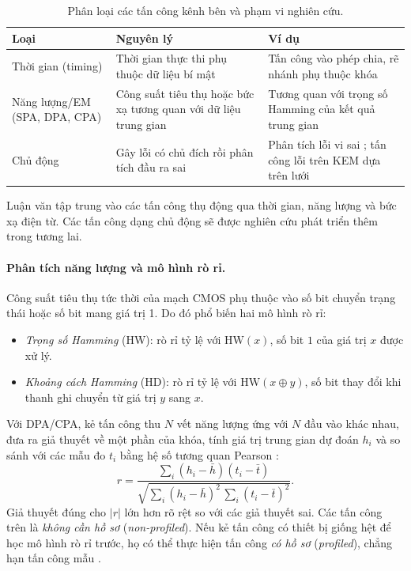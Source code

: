 \documentclass[../LuanVan.tex]{subfiles}
\begin{document}
\begin{table}[H]
\centering
\caption{Phân loại các tấn công kênh bên và phạm vi nghiên cứu.}
\label{tab:sca}
\begin{tabular}{L{3.2cm}|L{5cm}|L{5.5cm}}
\hline
\textbf{Loại} & \textbf{Nguyên lý} & \textbf{Ví dụ} \\ \hline
Thời gian (timing) & Thời gian thực thi phụ thuộc dữ liệu bí mật & Tấn công vào phép chia, rẽ nhánh phụ thuộc khóa \cite{Kocher96,KyberSlash24} \\ \hline
Năng lượng/EM \newline (SPA, DPA, CPA) & Công suất tiêu thụ hoặc bức xạ tương quan với dữ liệu trung gian & Tương quan với trọng số Hamming của kết quả trung gian \cite{KocherJJ99,BrierCO04} \\ \hline
Chủ động & Gây lỗi có chủ đích rồi phân tích đầu ra sai & Phân tích lỗi vi sai \cite{BihamShamir97}; tấn công lỗi trên KEM dựa trên lưới \cite{PesslProkop21} \\ \hline
\end{tabular}
\end{table}

Luận văn tập trung vào các tấn công thụ động qua thời gian, năng lượng và bức xạ điện từ. Các tấn công dạng chủ động sẽ được nghiên cứu phát triển thêm trong tương lai.

\paragraph{Phân tích năng lượng và mô hình rò rỉ.} Công suất tiêu thụ tức thời của mạch CMOS phụ thuộc vào số bit chuyển trạng thái hoặc số bit mang giá trị 1. Do đó phổ biến hai mô hình rò rỉ:
\begin{itemize}
    \item \textit{Trọng số Hamming} (HW): rò rỉ tỷ lệ với $\mathrm{HW}(x)$, số bit $1$ của giá trị $x$ được xử lý.
    \item \textit{Khoảng cách Hamming} (HD): rò rỉ tỷ lệ với $\mathrm{HW}(x\oplus y)$, số bit thay đổi khi thanh ghi chuyển từ giá trị $y$ sang $x$.
\end{itemize}
Với DPA/CPA, kẻ tấn công thu $N$ vết năng lượng ứng với $N$ đầu vào khác nhau, đưa ra giả thuyết về một phần của khóa, tính giá trị trung gian dự đoán $h_i$ và so sánh với các mẫu đo $t_i$ bằng hệ số tương quan Pearson \cite{BrierCO04}:
\begin{equation}
    r = \frac{\sum_{i}(h_i-\bar h)(t_i-\bar t)}{\sqrt{\sum_{i}(h_i-\bar h)^2\,\sum_{i}(t_i-\bar t)^2}}.
\end{equation}
Giả thuyết đúng cho $|r|$ lớn hơn rõ rệt so với các giả thuyết sai. Các tấn công trên là \textit{không cần hồ sơ} (\textit{non-profiled}). Nếu kẻ tấn công có thiết bị giống hệt để học mô hình rò rỉ trước, họ có thể thực hiện tấn công \textit{có hồ sơ} (\textit{profiled}), chẳng hạn tấn công mẫu \cite{ChariRR02}.
\end{document}

